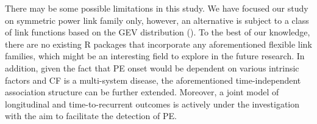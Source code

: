 There may be some possible limitations in this study. We have focused our study on symmetric power link family only, however, an alternative is subject to a class of link functions based on the GEV distribution (\cite{Wang2010}). To the best of our knowledge, there are no existing R packages that incorporate any aforementioned flexible link families, which might be an interesting field to explore in the future research. In addition, given the fact that PE onset would be dependent on various intrinsic factors and CF is a multi-system disease, the aforementioned time-independent association structure can be further extended. Moreover, a joint model of longitudinal and time-to-recurrent outcomes is actively under the investigation with the aim to facilitate the detection of PE.

